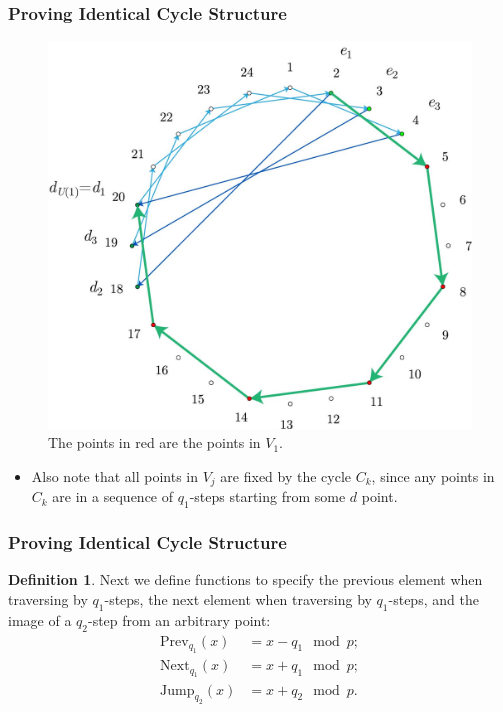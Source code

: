 \documentclass{beamer}
\theoremstyle{plain}
\theoremstyle{definition}
\newtheorem{Def}[theorem]{Definition}
\theoremstyle{remark}
\newcommand{\bee}{\begin{equation}\begin{aligned}}
\newcommand{\eee}{\end{aligned}\end{equation}}
\renewcommand{\'}{\hspace{0.5mm}'}		%
\begin{document}

\begin{frame}
\frametitle{Proving Identical Cycle Structure}

	\begin{figure}
		\includegraphics[scale=0.10]{circ_24_U.jpg}
		\caption{The points in red are the points
		in $V_1$. }
	\end{figure}
	\begin{itemize}
		\item Also note that all points in $V_j$
		are fixed by the cycle $C_k$, since any points in 
		$C_k$ are in a sequence of $q_1$-steps starting
		from some $d$ point. 
	\end{itemize}

\end{frame}


\begin{frame}
\frametitle{Proving Identical Cycle Structure}

	\begin{Def}
		Next we define functions to specify
		the previous element when traversing by
		$q_1$-steps, the next element when
		traversing by $q_1$-steps, and the image of 
		a $q_2$-step from an arbitrary point:
		\bee
			\mathrm{Prev}_{q_1}(x) &= x - q_1 \mod p; \\
			\mathrm{Next}_{q_1}(x) &= x + q_1 \mod p; \\
			\mathrm{Jump}_{q_2}(x) &= x + q_2 \mod p. 
		\eee
	\end{Def}

\end{frame}
\end{document}
